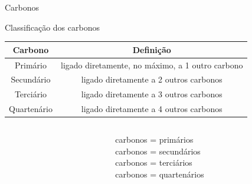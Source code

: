 \documentclass{beamer}
\begin{document}
\begin{frame}[label={sec:org341e25b}]{Carbonos}
\begin{block}{Classificação dos carbonos}
\begin{center}
\begin{tabular}{|c|c|}
\hline
\cellcolor{green!20} {\bfseries Carbono}  & \cellcolor{green!20} {\bfseries Definição} \\[0pt]
\hline
Primário & ligado diretamente, \alert{no máximo}, a \alert{1} outro carbono\\[0pt]
\hline
Secundário & ligado diretamente a \alert{2} outros carbonos\\[0pt]
\hline
Terciário & ligado diretamente  a \alert{3} outros carbonos\\[0pt]
\hline
Quartenário & ligado diretamente a \alert{4} outros carbonos\\[0pt]
\hline
\end{tabular}
\end{center}



\begin{columns}
\begin{column}{0.7\textwidth}
\chemmove{
\node[bal,fit=(A)]{};
\node[bal,fit=(B)]{};
\node[bal,fit=(D)]{};
\node[bal,fit=(E)]{};
\node[rect,fit=(F)]{};
\node[rect,fit=(G)]{};
\node[rect,fit=(H)]{};
\node[rect,fit=(I)]{};
\node[rect,fit=(J)]{};
\node[rect,fit=(K)]{};
\node[bal2,fit=(L)]{};
\node[bal2,fit=(M)]{};
\node[bal3,fit=(N)]{};
}
\end{column}
\begin{column}{0.3\textwidth}  %
      carbonos  = primários\\
      carbonos  = secundários\\
      carbonos  = terciários\\
      carbonos  = quartenários
     \chemmove{
      \node[bal,fit=(A)]{};
      \node[rect,fit=(B)]{};
      \node[bal2,fit=(D)]{};
      \node[bal3,fit=(E)]{};
      }
\end{column}
\end{columns}
\end{block}
\end{frame}
\end{document}
